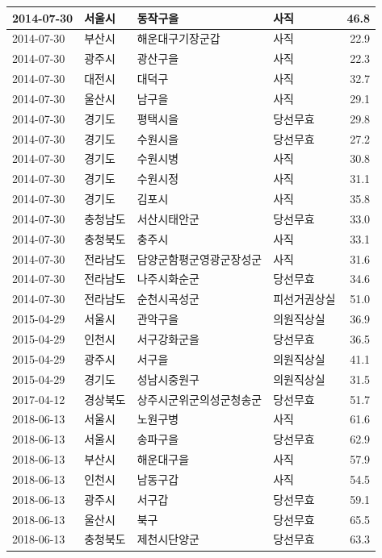 \documentclass[
  11pt,
  letter]{article}
\begin{document}
\begin{longtable}[t]{l|l|l|l|r}
\hline
2014-07-30 & 서울시 & 동작구을 & 사직 & 46.8\\
\hline
2014-07-30 & 부산시 & 해운대구기장군갑 & 사직 & 22.9\\
\hline
2014-07-30 & 광주시 & 광산구을 & 사직 & 22.3\\
\hline
2014-07-30 & 대전시 & 대덕구 & 사직 & 32.7\\
\hline
2014-07-30 & 울산시 & 남구을 & 사직 & 29.1\\
\hline
2014-07-30 & 경기도 & 평택시을 & 당선무효 & 29.8\\
\hline
2014-07-30 & 경기도 & 수원시을 & 당선무효 & 27.2\\
\hline
2014-07-30 & 경기도 & 수원시병 & 사직 & 30.8\\
\hline
2014-07-30 & 경기도 & 수원시정 & 사직 & 31.1\\
\hline
2014-07-30 & 경기도 & 김포시 & 사직 & 35.8\\
\hline
2014-07-30 & 충청남도 & 서산시태안군 & 당선무효 & 33.0\\
\hline
2014-07-30 & 충청북도 & 충주시 & 사직 & 33.1\\
\hline
2014-07-30 & 전라남도 & 담양군함평군영광군장성군 & 사직 & 31.6\\
\hline
2014-07-30 & 전라남도 & 나주시화순군 & 당선무효 & 34.6\\
\hline
2014-07-30 & 전라남도 & 순천시곡성군 & 피선거권상실 & 51.0\\
\hline
2015-04-29 & 서울시 & 관악구을 & 의원직상실 & 36.9\\
\hline
2015-04-29 & 인천시 & 서구강화군을 & 당선무효 & 36.5\\
\hline
2015-04-29 & 광주시 & 서구을 & 의원직상실 & 41.1\\
\hline
2015-04-29 & 경기도 & 성남시중원구 & 의원직상실 & 31.5\\
\hline
2017-04-12 & 경상북도 & 상주시군위군의성군청송군 & 당선무효 & 51.7\\
\hline
2018-06-13 & 서울시 & 노원구병 & 사직 & 61.6\\
\hline
2018-06-13 & 서울시 & 송파구을 & 당선무효 & 62.9\\
\hline
2018-06-13 & 부산시 & 해운대구을 & 사직 & 57.9\\
\hline
2018-06-13 & 인천시 & 남동구갑 & 사직 & 54.5\\
\hline
2018-06-13 & 광주시 & 서구갑 & 당선무효 & 59.1\\
\hline
2018-06-13 & 울산시 & 북구 & 당선무효 & 65.5\\
\hline
2018-06-13 & 충청북도 & 제천시단양군 & 당선무효 & 63.3\\

\end{longtable}
\end{document}
